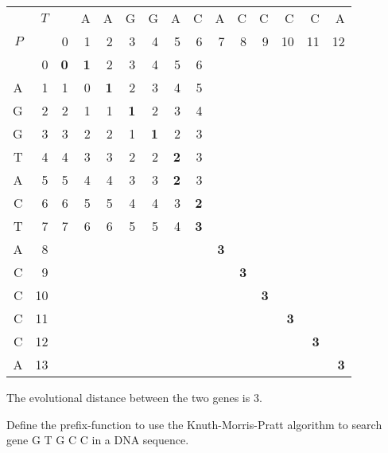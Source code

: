 {\begin{center} \begin{tabular}{r r | rrrrrrrrrrrrr}
        & $T$ &    & A & A & G & G & A & C & A & C & C &  C &  C &  A \\
    $P$ &     &  0 & 1 & 2 & 3 & 4 & 5 & 6 & 7 & 8 & 9 & 10 & 11 & 12 \\ \hline
        &   0 &  \textbf{0} & \textbf{1} & 2 & 3 & 4 & 5 & 6 &   &   &   &    &    &    \\
    A   &   1 &  1 & 0 & \textbf{1} & 2 & 3 & 4 & 5 &   &   &   &    &    &    \\
    G   &   2 &  2 & 1 & 1 & \textbf{1} & 2 & 3 & 4 &   &   &   &    &    &    \\
    G   &   3 &  3 & 2 & 2 & 1 & \textbf{1} & 2 & 3 &   &   &   &    &    &    \\
    T   &   4 &  4 & 3 & 3 & 2 & 2 & \textbf{2} & 3 &   &   &   &    &    &    \\
    A   &   5 &  5 & 4 & 4 & 3 & 3 & \textbf{2} & 3 &   &   &   &    &    &    \\
    C   &   6 &  6 & 5 & 5 & 4 & 4 & 3 & \textbf{2} &   &   &   &    &    &    \\
    T   &   7 &  7 & 6 & 6 & 5 & 5 & 4 & \textbf{3} &   &   &   &    &    &    \\
    A   &   8 &    &   &   &   &   &   &   & \textbf{3} &   &   &    &    &    \\
    C   &   9 &    &   &   &   &   &   &   &   & \textbf{3} &   &    &    &    \\
    C   &  10 &    &   &   &   &   &   &   &   &   & \textbf{3} &    &    &    \\
    C   &  11 &    &   &   &   &   &   &   &   &   &   & \textbf{3} &    &    \\
    C   &  12 &    &   &   &   &   &   &   &   &   &   &    & \textbf{3} &    \\
    A   &  13 &    &   &   &   &   &   &   &   &   &   &    &    & \textbf{3} \\
\end{tabular} \end{center}

The evolutional distance between the two genes is 3.

Define the prefix-function to use the Knuth-Morris-Pratt algorithm to search gene G T G C C in a DNA sequence.

\ansseparator

\newpage

}
